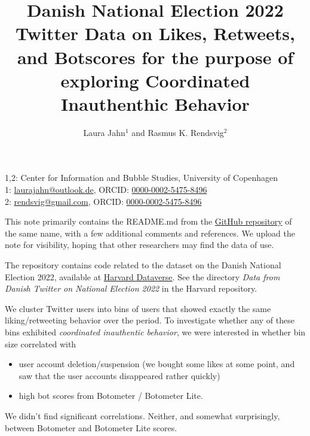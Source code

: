 \documentclass[10pt,english,sigconf,authoryear,nonacm]{article}
\newcommand{\lyxaddress}[1]{
	\par {\raggedright #1
	\vspace{1.4em}
	\noindent\par}
}
\begin{document}
\title{Danish National Election 2022 Twitter Data on Likes, Retweets, and
Botscores for the purpose of exploring Coordinated Inauthenthic Behavior}
\author{Laura Jahn$^{1}$ and Rasmus K. Rendsvig$^{2}$}
\maketitle

\lyxaddress{1,2: Center for Information and Bubble Studies, University of Copenhagen\\
1: \href{mailto:laurajahn@outlook.de}{laurajahn@outlook.de}, ORCID:
\href{https://orcid.org/0000-0002-5475-8496}{0000-0002-5475-8496}\\
2: \href{mailto:rendsvig@gmail.com}{rendsvig@gmail.com}, ORCID: \href{https://orcid.org/0000-0002-5475-8496}{0000-0002-5475-8496}}

\noindent This note primarily contains the README.md from the \href{https://github.com/LJ-9/Danish-Election-2022-Twitter-Likes-Retweets-Botscores-Inauthentic-Coordinated-Behavior}{GitHub repository}
of the same name, with a few additional comments and references. We
upload the note for visibility, hoping that other researchers may
find the data of use.

The repository contains code related to the dataset on the Danish
National Election 2022, available at \href{https://doi.org/10.7910/DVN/RWPZUN}{Harvard Dataverse}.
See the directory \emph{Data from Danish Twitter on National Election
2022} in the Harvard repository.

We cluster Twitter users into bins of users that showed exactly the
same liking/retweeting behavior over the period. To investigate whether
any of these bins exhibited \emph{coordinated inauthentic behavior},
we were interested in whether bin size correlated with
\begin{itemize}
\item user account deletion/suspension (we bought some likes at some point,
and saw that the user accounts disappeared rather quickly)
\item high bot scores from Botometer / Botometer Lite.
\end{itemize}
We didn't find significant correlations. Neither, and somewhat surprisingly,
between Botometer and Botometer Lite scores.
\end{document}
